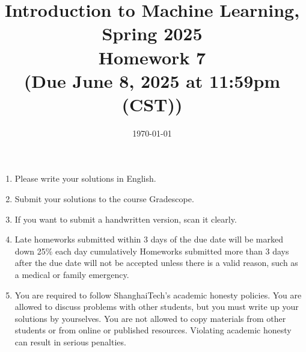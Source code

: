 \documentclass[10pt]{article}
\begin{document}
\date{\today}
\title{Introduction to Machine Learning, Spring 2025 \\
	Homework 7 \\
	\small (Due June 8, 2025 at 11:59pm (CST))}
\maketitle

\begin{enumerate}
	\item Please write your solutions in English.
	\item Submit your solutions to the course Gradescope.
	\item If you want to submit a handwritten version, scan it clearly.
	\item Late homeworks submitted within 3 days of the due date will be marked down 25\% each day cumulatively Homeworks submitted more than 3 days after the due date will not be accepted unless there is a valid reason, such as a medical or family emergency.
	\item You are required to follow ShanghaiTech's academic honesty policies.  You are allowed to discuss problems with other students, but you must write up your solutions by yourselves.  You are not allowed to copy materials from other students or from online or published resources.  Violating academic honesty can result in serious penalties.
	\end{enumerate}
\newpage


\begin{enumerate}


\end{enumerate}
\end{document}

